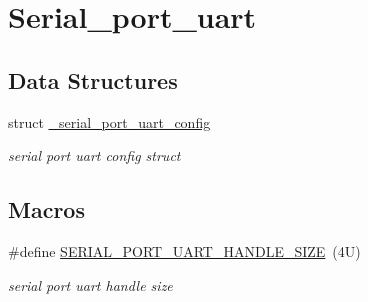 \hypertarget{group__serial__port__uart}{}\section{Serial\+\_\+port\+\_\+uart}
\label{group__serial__port__uart}
\subsection*{Data Structures}
\begin{DoxyCompactItemize}
\item 
struct \mbox{\hyperlink{struct__serial__port__uart__config}{\+\_\+serial\+\_\+port\+\_\+uart\+\_\+config}}
\begin{DoxyCompactList}\small\item\em serial port uart config struct \end{DoxyCompactList}\end{DoxyCompactItemize}
\subsection*{Macros}
\begin{DoxyCompactItemize}
\item 
\mbox{\label{group__serial__port__uart_ga2109c092d5f72ef7729b0454b40e892f}} 
\#define \mbox{\hyperlink{group__serial__port__uart_ga2109c092d5f72ef7729b0454b40e892f}{S\+E\+R\+I\+A\+L\+\_\+\+P\+O\+R\+T\+\_\+\+U\+A\+R\+T\+\_\+\+H\+A\+N\+D\+L\+E\+\_\+\+S\+I\+ZE}}~(4\+U)
\begin{DoxyCompactList}\small\item\em serial port uart handle size \end{DoxyCompactList}\end{DoxyCompactItemize}
